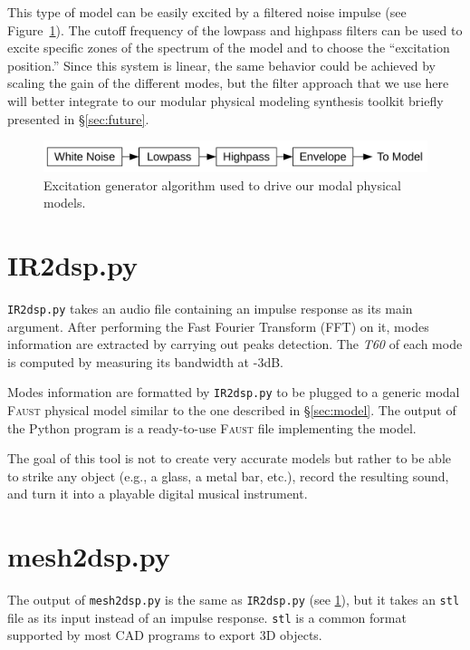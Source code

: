 \documentclass[11pt,a4paper]{article}
\newcommand{\f}{\textsc{Faust}}
\begin{document}
This type of model can be easily excited by a filtered noise impulse (see Figure~\ref{fig:excitation}). The cutoff frequency of the lowpass and highpass filters can be used to excite specific zones of the spectrum of the model and to choose the ``excitation position.'' Since this system is linear, the same behavior could be achieved by scaling the gain of the different modes, but the filter approach that we use here will better integrate to our modular physical modeling synthesis toolkit briefly presented in \S{}\ref{sec:future}. 

\begin{figure}[htbp]
 	\centering \includegraphics[width=\columnwidth]{pictures/excitation}
	\caption{Excitation generator algorithm used to drive our modal physical models.}
	\label{fig:excitation}
\end{figure}

\section{IR2dsp.py}
\label{sec:irdsp}

\texttt{IR2dsp.py} takes an audio file containing an impulse response as its main argument. After performing the Fast Fourier Transform (FFT) on it, modes information are extracted by carrying out peaks detection. The \textit{T60} of each mode is computed by measuring its bandwidth at -3dB.

Modes information are formatted by \texttt{IR2dsp.py} to be plugged to a generic modal \f{} physical model similar to the one described in \S{}\ref{sec:model}. The output of the Python program is a ready-to-use \f{} file implementing the model. 

The goal of this tool is not to create very accurate models but rather to be able to strike any object (e.g., a glass, a metal bar, etc.), record the resulting sound, and turn it into a playable digital musical instrument.

\section{mesh2dsp.py}

The output of \texttt{mesh2dsp.py} is the same as \texttt{IR2dsp.py} (see \ref{sec:irdsp}), but it takes an \texttt{stl} file as its input instead of an impulse response. \texttt{stl} is a common format supported by most CAD programs to export 3D objects.
\end{document}
